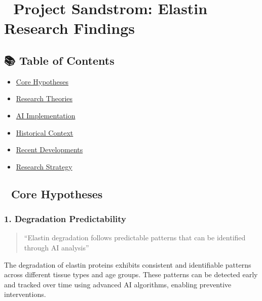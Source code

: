 \section{🧬 Project Sandstrom: Elastin Research
Findings}\label{project-sandstrom-elastin-research-findings}


\subsection{📚 Table of Contents}\label{table-of-contents}

\begin{itemize}
\tightlist
\item
  \hyperref[-core-hypotheses]{Core Hypotheses}
\item
  \hyperref[-research-theories]{Research Theories}
\item
  \hyperref[-ai-implementation]{AI Implementation}
\item
  \hyperref[-historical-context]{Historical Context}
\item
  \hyperref[-recent-developments]{Recent Developments}
\item
  \hyperref[-research-strategy]{Research Strategy}
\end{itemize}

\subsection{🎯 Core Hypotheses}\label{core-hypotheses}

\subsubsection{1. Degradation
Predictability}\label{degradation-predictability}

\begin{quote}
``Elastin degradation follows predictable patterns that can be
identified through AI analysis''
\end{quote}

The degradation of elastin proteins exhibits consistent and identifiable
patterns across different tissue types and age groups. These patterns
can be detected early and tracked over time using advanced AI
algorithms, enabling preventive interventions.

